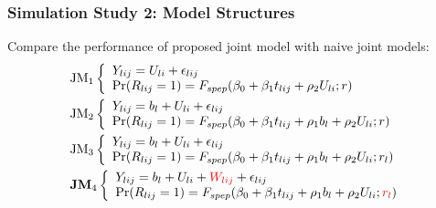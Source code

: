 \documentclass[fleqn]{beamer}
\begin{document}
\begin{frame}
\frametitle{Simulation Study 2: Model Structures}
Compare the performance of proposed joint model with naive joint models: 
 \begin{align*}
& \mbox{JM}_1 \left \{\begin{array}{ll}
        Y_{lij}= U_{li} + \epsilon_{lij} \\
       \mbox{Pr}(R_{lij}=1)=F_{spep}(\beta_0+\beta_1t_{lij}+ \rho_2 U_{li};r) \\
\end{array}\right. \\
& \mbox{JM}_2 \left \{\begin{array}{ll}
        Y_{lij}=b_l + U_{li} + \epsilon_{lij}\\
       \mbox{Pr}(R_{lij}=1)=F_{spep}(\beta_0+\beta_1t_{lij}+\rho_1 b_l + \rho_2 U_{li};r) \\
\end{array}\right. \\
& \mbox{JM}_3 \left \{\begin{array}{ll}
       Y_{lij}=b_l + U_{li} + \epsilon_{lij} \\
       \mbox{Pr}(R_{lij}=1)=F_{spep}(\beta_0+\beta_1t_{lij}+\rho_1 b_l + \rho_2 U_{li};r_l) \\
        \end{array}\right.\\
& \mbox{\bf JM}_4 \left \{\begin{array}{ll}
        Y_{lij}=b_l + U_{li} + \textcolor{red}{W_{lij}} + \epsilon_{lij} \\
       \mbox{Pr}(R_{lij}=1)=F_{spep}(\beta_0+\beta_1t_{lij}+\rho_1 b_l + \rho_2 U_{li};\textcolor{red}{r_l}) \\
       \end{array}\right.        
\end{align*}

\end{frame}
\end{document}
